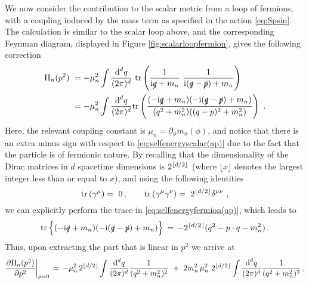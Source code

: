 We now consider the contribution to the scalar metric from a loop of fermions, with a coupling induced by the mass term as specified in the action \eqref{eq:Spsin}. The calculation is similar to the scalar loop above, and the corresponding Feynman diagram, displayed in Figure \ref{fig:scalarloopfermion}, gives the following correction
%
\begin{equation}\label{eq:selfenergyfermion(ap)}
			\begin{aligned}
				\Pi_n(p^2) \ &= -\mu_n^2  \int \frac {\text{d}^dq}{(2\pi)^d}\ \text{tr} \left (\frac {1}{\i \slashed{q}+m_n}\ \frac {1}{\i (\slashed{q}-\slashed{p})+m_n} \right)\\
				&= -\mu_n^2  \int \frac {\text{d}^dq}{(2\pi)^d} \text{tr} \left ( \frac{(-\i \slashed{q} + m_n)(-\i (\slashed{q}-\slashed{p})+m_n)}{(q^2+m_n^2)((q-p)^2+m_n^2)} \right)\ . 
			\end{aligned}
\end{equation}
%
Here, the relevant coupling constant is $\mu_n = \partial_\phi m_n(\phi)$, and notice that there is an extra minus sign with respect to \eqref{eq:selfenergyscalar(ap)} due to the fact that the particle is of fermionic nature. By recalling that the dimensionality of the Dirac matrices in $d$ spacetime dimensions is $2^{\lfloor d/2 \rfloor}$ (where $\lfloor x \rfloor$ denotes the largest integer less than or equal to $x$), and using the following identities
%
\begin{equation}
			\label{eq:scalarloopfermionstraces}
			\text{tr} \left(\gamma^{\mu} \right)=\ 0\,  , \qquad
			\text{tr} \left(\gamma^{\mu} \gamma^{\nu}\right)=\ 2^{\lfloor d/2 \rfloor} \delta^{\mu \nu}\ ,
\end{equation}
%
we can explicitly perform the trace in \eqref{eq:selfenergyfermion(ap)}, which leads to
%
\begin{equation}
			\text{tr}\left\{ (-\text{i} \slashed{q} + m_n)(-\text{i}(\slashed{q}-\slashed{p})+m_n) \right\} \, =\, -2^{\lfloor d/2 \rfloor} (q^2 - p\cdot q -m_n^2)\, .
\end{equation}
%
Thus, upon extracting the part that is linear in $p^2$ we arrive at
%
\begin{equation}\label{eq:fermionloopddim}
			\frac{\partial \Pi_n(p^2)}{\partial p^2} \bigg\rvert_{p=0} \, = \,   -\mu_n^2\, 2^{\lfloor d/2 \rfloor}  \int \frac {\text{d}^dq}{(2\pi)^d} \frac{1}{(q^2+m_n^2)^2} \ + \ 2 m_n^2 \, \mu_n^2\ 2^{\lfloor d/2 \rfloor} \int \frac {\text{d}^dq}{(2\pi)^d} \frac{1}{(q^2+m_n^2)^3} \, ,
\end{equation}
%
